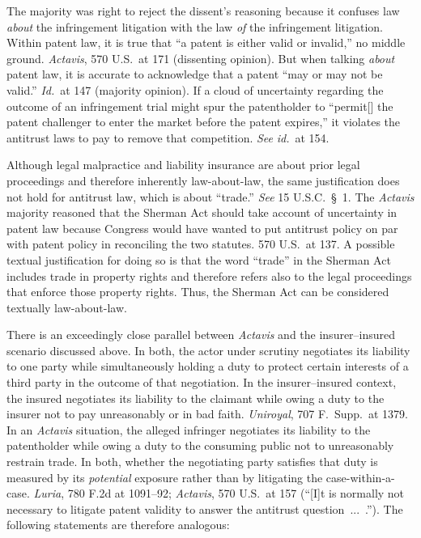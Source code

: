 \documentclass[
  12pt,
  letterpaper,
]{scrartcl}
\begin{document}
The majority was right to reject the dissent's reasoning because it confuses
law \textit{about} the infringement litigation with the law \textit{of} the
infringement litigation. Within patent law, it is true that ``a patent is
either valid or invalid,'' no middle ground. \textit{Actavis}, 570 U.S.~at 171
(dissenting opinion). But when talking \textit{about} patent law, it is
accurate to acknowledge that a patent ``may or may not be valid.''
\textit{Id.}~at 147 (majority opinion). If a cloud of uncertainty regarding the
outcome of an infringement trial might spur the patentholder to ``permit[] the
patent challenger to enter the market before the patent expires,'' it violates
the antitrust laws to pay to remove that competition. \textit{See}
\textit{id.}~at 154.

Although legal malpractice and liability insurance are about prior legal
proceedings and therefore inherently law-about-law, the same justification does
not hold for antitrust law, which is about ``trade.'' \textit{See} 15
U.S.C.~§~1. The \textit{Actavis} majority reasoned that the Sherman Act should
take account of uncertainty in patent law because Congress would have wanted to
put antitrust policy on par with patent policy in reconciling the two statutes.
570 U.S.~at 137. A possible textual justification for doing so is that the word
``trade'' in the Sherman Act includes trade in property rights and therefore
refers also to the legal proceedings that enforce those property rights. Thus,
the Sherman Act can be considered textually law-about-law.

There is an exceedingly close parallel between \textit{Actavis} and the
insurer--insured scenario discussed above. In both, the actor under scrutiny
negotiates its liability to one party while simultaneously holding a duty to
protect certain interests of a third party in the outcome of that negotiation.
In the insurer--insured context, the insured negotiates its liability to the
claimant while owing a duty to the insurer not to pay unreasonably or in bad
faith. \textit{Uniroyal}, 707 F.~Supp.~at 1379. In an \emph{Actavis} situation,
the alleged infringer negotiates its liability to the patentholder while owing
a duty to the consuming public not to unreasonably restrain trade. In both,
whether the negotiating party satisfies that duty is measured by its
\emph{potential} exposure rather than by litigating the case-within-a-case.
\textit{Luria}, 780 F.2d at 1091--92; \textit{Actavis}, 570 U.S.~at 157 (``[I]t
is normally not necessary to litigate patent validity to answer the antitrust
question ... .''). The following statements are therefore analogous:
\end{document}
